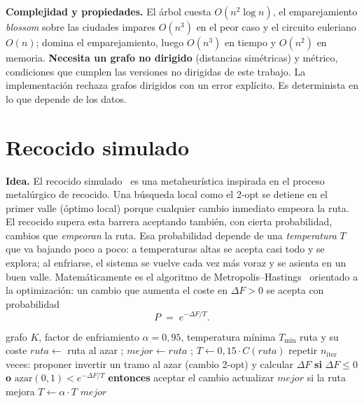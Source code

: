 \textbf{Complejidad y propiedades.} El árbol cuesta $O(n^2\log n)$, el emparejamiento \emph{blossom} sobre las ciudades impares $O(n^3)$ en el peor caso y el circuito euleriano $O(n)$; domina el emparejamiento, luego $O(n^3)$ en tiempo y $O(n^2)$ en memoria.
\textbf{Necesita un grafo no dirigido} (distancias simétricas) y métrico, condiciones que cumplen las versiones no dirigidas de este trabajo. La implementación rechaza grafos dirigidos con un error explícito. Es determinista en lo que depende de los datos.

\section{Recocido simulado}\label{sec:recocido}

\textbf{Idea.} El recocido simulado~\cite{kirkpatrick1983} es una metaheurística inspirada en el proceso metalúrgico de recocido. Una búsqueda local como el 2-opt se detiene en el primer valle (óptimo local) porque cualquier cambio inmediato
empeora la ruta. El recocido supera esta barrera aceptando también, con cierta probabilidad, cambios que \emph{empeoran} la ruta. Esa probabilidad depende de una \emph{temperatura} $T$ que va bajando poco a poco: a temperaturas altas se acepta casi todo y se explora; al enfriarse,
el sistema se vuelve cada vez más voraz y se asienta en un buen valle. Matemáticamente es el algoritmo de Metropolis--Hastings~\cite{metropolis1953} orientado a la optimización: un cambio que aumenta el coste en $\Delta F>0$ se acepta con probabilidad
\begin{equation}\label{eq:metropolis}
  P\;=\;e^{-\Delta F/T}.
\end{equation}

\begin{algorithm}[htbp]
  \caption{Recocido simulado}\label{alg:sa}
  \begin{algorithmic}[1]
    \Require grafo $K$, factor de enfriamiento $\alpha=0{,}95$, temperatura mínima $T_{\min}$
    \Ensure ruta y su coste
    \State $ruta \gets$ ruta al azar \;;\; $mejor \gets ruta$ \;;\; $T \gets 0{,}15\cdot C(ruta)$
      \State repetir $n_{\text{iter}}$ veces:
      \State \hspace{1.2em} proponer invertir un tramo al azar (cambio 2-opt) y calcular $\Delta F$
      \State \hspace{1.2em} \textbf{si} $\Delta F\le 0$ \textbf{o} $\text{azar}(0,1)<e^{-\Delta F/T}$ \textbf{entonces} aceptar el cambio
      \State \hspace{1.2em} actualizar $mejor$ si la ruta mejora
      \State $T \gets \alpha\cdot T$ 
    \EndWhile
    \State \Return $mejor$
  \end{algorithmic}
\end{algorithm}

